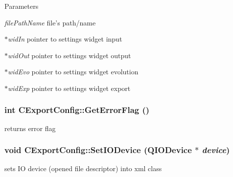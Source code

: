 \begin{DoxyParams}{Parameters}
\item[{\em filePathName}]file's path/name \item[{\em $\ast$widIn}]pointer to settings widget input \item[{\em $\ast$widOut}]pointer to settings widget output \item[{\em $\ast$widEvo}]pointer to settings widget evolution \item[{\em $\ast$widExp}]pointer to settings widget export \end{DoxyParams}
\hypertarget{classCExportConfig_a45d8601ab227c344d06c8f15d4afdc56}{
\subsubsection[{GetErrorFlag}]{\setlength{\rightskip}{0pt plus 5cm}int CExportConfig::GetErrorFlag ()}}
\label{classCExportConfig_a45d8601ab227c344d06c8f15d4afdc56}
returns error flag \hypertarget{classCExportConfig_af5f2911f8d37299ad02027203c78d934}{
\subsubsection[{SetIODevice}]{\setlength{\rightskip}{0pt plus 5cm}void CExportConfig::SetIODevice (QIODevice $\ast$ {\em device})}}
\label{classCExportConfig_af5f2911f8d37299ad02027203c78d934}
sets IO device (opened file descriptor) into xml class


